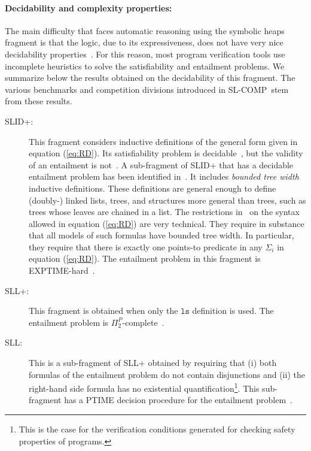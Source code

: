 \documentclass[twoside,11pt]{article}
\newcommand{\ls}{\mathtt{ls}}
\newcommand{\SLRD}{\textsc{SLID}}
\newcommand{\SLL}{\textsc{SLL}}
\newcommand{\slcomp}{\textsf{SL-COMP}}
\begin{document}
\paragraph{Decidability and complexity properties:}
The main difficulty that faces automatic reasoning using the symbolic heaps fragment is that the logic, 
due to its expressiveness, does not have very nice decidability properties~\cite{AntonopoulosGHKO14}.
For this reason, most program verification tools use incomplete heuristics to solve the satisfiability and entailment problems.
%
We summarize below the results obtained on the decidability of this fragment.
The various benchmarks and competition divisions introduced in \slcomp\ stem from these results.
\begin{description}
\item[\SLRD+:]
This fragment considers inductive definitions of the general form given in equation (\ref{eq:RD}).
Its satisfiability problem is decidable~\cite{BrotherstonFGNP13},
but the validity of an entailment is not~\cite{AntonopoulosGHKO14}.
%
A sub-fragment of \SLRD+ that has a decidable entailment problem has been identified in~\cite{IosifRS13}. It includes \emph{bounded tree width} inductive definitions.
These definitions are general enough to define (doubly-) linked lists, trees,
and structures more general than trees, such as trees whose leaves are chained in
a list. 
The restrictions in~\cite{IosifRS13} on the syntax allowed in equation (\ref{eq:RD}) are very technical. They require in substance that all models of such formulas have bounded tree width. 
In particular, they require that there is exactly one points-to predicate in any $\Sigma_i$ in equation (\ref{eq:RD}).
The entailment problem in this fragment is EXPTIME-hard~\cite{AntonopoulosGHKO14}.

\item[\SLL+:]
This fragment is obtained when only the $\ls$ definition is used.
The entailment problem is $\Pi^P_2$-complete~\cite{AntonopoulosGHKO14}.

\item[\SLL:]
This is a sub-fragment of \SLL+ obtained by requiring that
(i) both formulas of the entailment problem do not contain disjunctions and 
(ii) the right-hand side formula has no existential quantification\footnote{This is the case for the verification conditions generated for checking safety properties of programs.}. 
This sub-fragment has a PTIME decision procedure for the entailment problem~\cite{CookHOPW11}.
\end{description}
\end{document}

